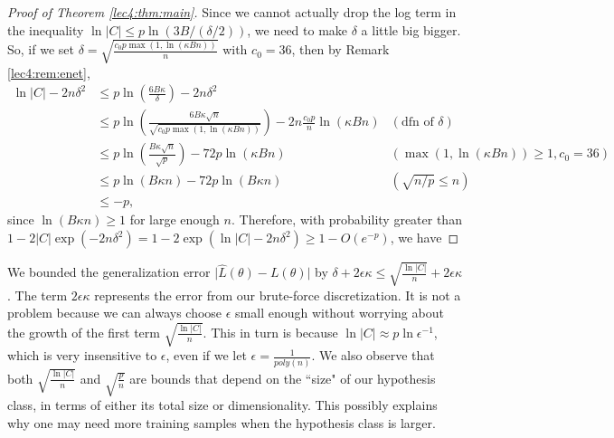 \begin{proof}[Proof of Theorem \ref{lec4:thm:main}]
Since we cannot actually drop the log term in the inequality $\ln{|C|} \leq p \ln{ (3B / (\delta / 2)) }$, we need to make $\delta$ a little big bigger. So, if we set $\delta = \sqrt{\frac{c_0 p \max(1, \ln{(\kappa Bn)})}{n}}$ with $c_0 = 36$, then by Remark \ref{lec4:rem:enet},
\begin{align}
\ln{\vert C \vert} - 2n\delta^2 &\leq p \ln\left(\frac{6B \kappa}{\delta}\right) - 2n\delta^2 \\
&\leq p \ln\left(\frac{6B\kappa \sqrt{n}}{ \sqrt{c_0 p \max(1, \ln{(\kappa Bn)})} }\right) - 2n \frac{c_0p}{n} \ln(\kappa Bn) &(\text{dfn of } \delta)  \\
&\leq p\ln\left(\frac{B\kappa \sqrt{n}}{\sqrt{p}}\right) - 72 p \ln(\kappa Bn) &(\max(1, \ln{(\kappa Bn)}) \geq 1, c_0 = 36) \\
&\leq p \ln(B\kappa n) - 72 p \ln(B\kappa n) &(\sqrt{n/p} \leq n) \\
&\leq -p,
\end{align}
since $\ln (B\kappa n) \geq 1$ for large enough $n$. Therefore, with probability greater than $1 - 2|C| \exp(-2n\delta^2) = 1 - 2 \exp(\ln{|C|} - 2n\delta^2) \geq 1 - O(e^{-p})$, we have
\end{proof}

\begin{remark}
We bounded the generalization error $\vert \hat L(\theta) - L(\theta) \vert$ by $\delta + 2\epsilon \kappa \leq \sqrt{\frac{\ln{\vert C \vert}}{n}} + 2\epsilon \kappa$. The term $2\epsilon \kappa$ represents the error from our brute-force discretization. It is not a problem because we can always choose $\epsilon$ small enough without worrying about the growth of the first term $\sqrt{\frac{\ln{\vert C \vert}}{n}}$. This in turn is because $\ln{\vert C \vert} \approx p\ln{\epsilon^{-1}}$, which is very insensitive to $\epsilon$, even if we let $\epsilon = \frac{1}{poly(n)}$. We also observe that both $\sqrt{\frac{\ln{\vert C \vert}}{n}}$ and $\sqrt{\frac{p}{n}}$ are bounds that depend on the ``size" of our hypothesis class, in terms of either its total size or dimensionality. This possibly explains why one may need more training samples when the hypothesis class is larger.
\end{remark}
